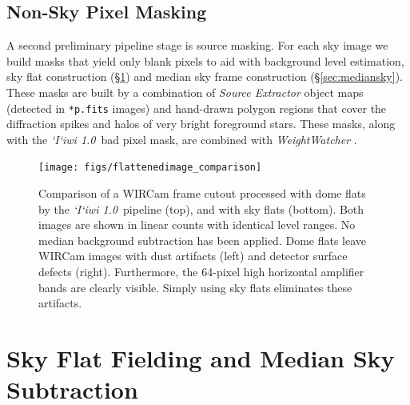 \documentclass[iop]{emulateapj}
\newcommand{\sw}[1]{\textit{#1}} %
\newcommand{\iiwione}{\sw{`I`iwi 1.0}}
\newcommand{\Sec}[1]{\S\ref{sec:#1}}  %
\begin{document}
\subsection{Non-Sky Pixel Masking}

A second preliminary pipeline stage is source masking.
For each sky image we build masks that yield only blank pixels to aid with background level estimation, sky flat construction (\Sec{flats}) and median sky frame construction (\Sec{mediansky}).
These masks are built by a combination of \sw{Source Extractor} object maps (detected in \texttt{*p.fits} images) and hand-drawn polygon regions that cover the diffraction spikes and halos of very bright foreground stars.
These masks, along with the \iiwione\ bad pixel mask, are combined with \sw{WeightWatcher} \citep{Marmo:2008}.

\begin{figure}[t]
\centering
\texttt{[image: figs/flattenedimage\_comparison]}
\caption{Comparison of a WIRCam frame cutout processed with dome flats by the \iiwione\ pipeline (top), and with sky flats (bottom).
Both images are shown in linear counts with identical level ranges.
No median background subtraction has been applied.
Dome flats leave WIRCam images with dust artifacts (left) and detector surface defects (right). Furthermore, the 64-pixel high horizontal amplifier bands are clearly visible.
Simply using sky flats eliminates these artifacts.
}
\label{fig:flattenedimage_comparison}
\end{figure}


\section{Sky Flat Fielding and Median Sky Subtraction}
\label{sec:flats}
\end{document}
